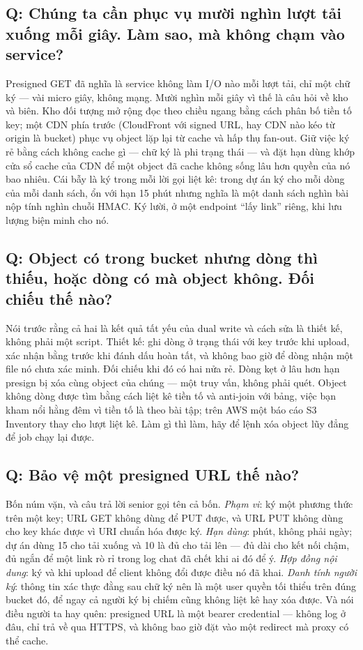 \subsection*{Q: Chúng ta cần phục vụ mười nghìn lượt tải xuống mỗi giây. Làm sao, mà không chạm vào service?}

Presigned GET đã nghĩa là service không làm I/O nào mỗi lượt tải, chỉ
một chữ ký --- vài micro giây, không mạng. Mười nghìn mỗi giây vì thế
là câu hỏi về kho và biên. Kho đối tượng mở rộng đọc theo chiều ngang
bằng cách phân bố tiền tố key; một CDN phía trước (CloudFront với signed
URL, hay CDN nào kéo từ origin là bucket) phục vụ object lặp lại từ
cache và hấp thụ fan-out. Giữ việc ký rẻ bằng cách không cache gì ---
chữ ký là phi trạng thái --- và đặt hạn dùng khớp cửa sổ cache của CDN
để một object đã cache không sống lâu hơn quyền của nó bao nhiêu. Cái
bẫy là ký trong mỗi lời gọi liệt kê:  trong dự án ký
cho mỗi dòng của mỗi danh sách, ổn với hạn 15 phút nhưng nghĩa là một
danh sách nghìn bài nộp tính nghìn chuỗi HMAC. Ký lười, ở một endpoint
``lấy link'' riêng, khi lưu lượng biện minh cho nó.

\subsection*{Q: Object có trong bucket nhưng dòng thì thiếu, hoặc dòng có mà object không. Đối chiếu thế nào?}

Nói trước rằng cả hai là kết quả tất yếu của dual write và cách sửa là
thiết kế, không phải một script. Thiết kế: ghi dòng ở trạng thái
 với key trước khi upload, xác nhận bằng  trước
khi đánh dấu hoàn tất, và không bao giờ để dòng nhận một file nó chưa
xác minh. Đối chiếu khi đó có hai nửa rẻ. Dòng kẹt ở  lâu
hơn hạn presign bị xóa cùng object của chúng --- một truy vấn, không
phải quét. Object không dòng được tìm bằng cách liệt kê tiền tố và
anti-join với bảng, việc bạn kham nổi hằng đêm vì tiền tố là theo bài
tập; trên AWS một báo cáo S3 Inventory thay cho lượt liệt kê. Làm gì
thì làm, hãy để lệnh xóa object lũy đẳng để job chạy lại được.

\subsection*{Q: Bảo vệ một presigned URL thế nào?}

Bốn núm vặn, và câu trả lời senior gọi tên cả bốn. \emph{Phạm vi}: ký
một phương thức trên một key; URL GET không dùng để PUT được, và URL
PUT không dùng cho key khác được vì URI chuẩn hóa được ký. \emph{Hạn
dùng}: phút, không phải ngày; dự án dùng 15 cho tải xuống và 10 là đủ
cho tải lên --- đủ dài cho kết nối chậm, đủ ngắn để một link rò rỉ
trong log chat đã chết khi ai đó để ý. \emph{Hợp đồng nội dung}: ký
 và  khi upload để client không
đổi được điều nó đã khai. \emph{Danh tính người ký}: thông tin xác thực
đằng sau chữ ký nên là một user quyền tối thiểu trên đúng bucket đó, để
ngay cả người ký bị chiếm cũng không liệt kê hay xóa được. Và nói điều
người ta hay quên: presigned URL là một bearer credential --- không log
ở đâu, chỉ trả về qua HTTPS, và không bao giờ đặt vào một redirect mà
proxy có thể cache.


